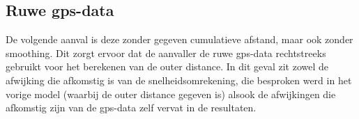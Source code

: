 \begin{table}[h]
    \centering
    \captionsetup{justification=centering}
    \caption{Aanval op basis van gegeven \textit{outer distance}, en snelheid}\label{tab:outerDistance}
\end{table}

\subsection{Ruwe gps-data}
De volgende aanval is deze zonder gegeven cumulatieve afstand, maar ook zonder
smoothing. Dit zorgt ervoor dat de aanvaller de ruwe \ac{gps}-data rechtstreeks
gebruikt voor het berekenen van de outer distance. In dit geval zit zowel de
afwijking die afkomstig is van de snelheidsomrekening, die besproken werd in
het vorige model (waarbij de outer distance gegeven is) alsook de afwijkingen
die afkomstig zijn van de \ac{gps}-data zelf vervat in de resultaten.

